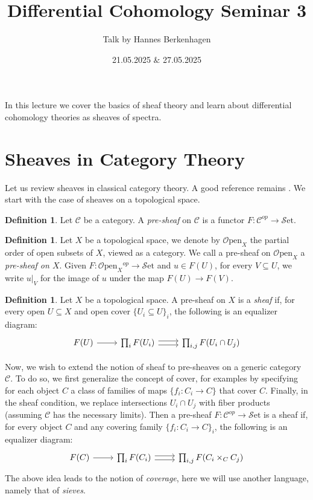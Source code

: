 \documentclass[10pt]{amsart}
\title{Differential Cohomology Seminar 3}
\date{21.05.2025 $\&$ 27.05.2025}
\author{Talk by Hannes Berkenhagen}
\newcommand{\C}{\mathscr{C}}
\newcommand{\set}{\mathscr{S}\mathrm{et}}
\newcommand{\Open}{\mathscr{O}\mathrm{pen}}
\theoremstyle{definition}
\newtheorem{definition}[equation]{Definition}
\theoremstyle{remark}
\numberwithin{equation}{section}
\begin{document}
\maketitle

	\maketitle
	
	In this lecture we cover the basics of sheaf theory and learn about differential cohomology theories as sheaves of spectra. 
	
	\section{Sheaves in Category Theory}
	Let us review sheaves in classical category theory. A good reference remains \cite{maclanemoerdijk1994topos}. We start with  the case of sheaves on a topological space. 
	\begin{definition}
		Let $\C$ be a category. A \emph{pre-sheaf} on $\C$ is a functor $F:\C^{op}\to\set$. 
	\end{definition}
	\begin{definition}
		Let $X$ be a topological space, we denote by $\Open_X$ the partial order of open subsets of $X$, viewed as a category. We call a pre-sheaf on $\Open_X$ a \emph{pre-sheaf on $X$}. Given $F:\Open_X{}^{op}\to\set$ and $u\in F(U)$, for every $V\subseteq U$, we write $u|_V$ for the image of $u$ under the map $F(U)\to F(V)$. 
	\end{definition}	
	\begin{definition}
		Let $X$ be a topological space. A pre-sheaf on $X$ is a \emph{sheaf} if, for every open $U\subseteq X$ and open cover $\{U_i\subseteq U\}_i$, the following is an equalizer diagram:
		\[
		\begin{tikzcd}
			F(U) \arrow[r] & \prod_iF(U_i) \arrow[r, shift left=1] \arrow[r, shift right = 1] &   \prod_{i,j} F(U_i \cap U_j) 
		\end{tikzcd}
		\]
	\end{definition}
	Now, we wish to extend the notion of sheaf to pre-sheaves on a generic category $\C$.
	To do so, we first generalize the concept of cover, for examples by specifying for each object $C$ a class of families of maps $\{f_i:C_i\to C\}$ that {cover} $C$. Finally, in the sheaf condition, we replace intersections $U_i\cap U_j$ with fiber products (assuming $\C$ has the necessary limits). Then a pre-sheaf $F:\C^{op}\to\set$ is a sheaf if, for every object $C$ and any covering family $\{f_i:C_i\to C\}_i$, the following is an equalizer diagram:\[
		\begin{tikzcd}
			F(C) \arrow[r] & \prod_i F(C_i) \arrow[r, shift left=1] \arrow[r, shift right = 1] &   \prod_{i,j} F(C_i \times_C C_j) 
		\end{tikzcd}
		\]
	The above idea leads to the notion of \emph{coverage}, here we will use another language, namely that of \emph{sieves}. 
	
\end{document}
